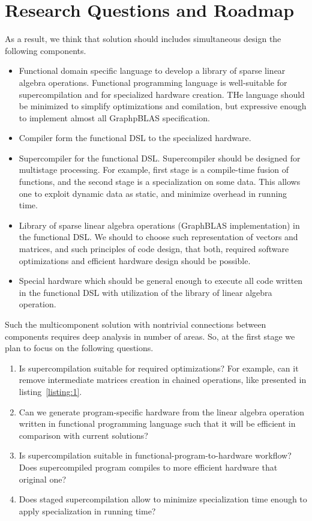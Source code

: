 \documentclass[10pt,conference]{IEEEtran}
\newcommand\todo[1]{{\color{red}#1}}
\begin{document}

\section{Research Questions and Roadmap}

As a result, we think that solution should includes simultaneous design the following components.
\begin{itemize}
  \item Functional domain specific language to develop a library of sparse linear algebra operations. 
  Functional programming language is well-suitable for supercompilation and for specialized hardware creation.
  THe language should be minimized to simplify optimizations and comilation, but expressive enough to implement almost all GraphpBLAS specification.
  \item Compiler form the functional DSL to the specialized hardware. 
  \item Supercompiler for the functional DSL. Supercompiler should be designed for multistage processing.
  For example, first stage is a compile-time fusion of functions, and the second stage is a specialization on some data. 
  This allows one to exploit dynamic data as static, and minimize overhead in running time. 
  \item Library of sparse linear algebra operations (GraphBLAS implementation) in the functional DSL.
  We should to choose such representation of vectors and matrices, and such principles of code design, that both, required software optimizations and efficient hardware design should be possible.  
  \item Special hardware which should be general enough to execute all code written in the functional DSL with utilization of the library of linear algebra operation.  
\end{itemize}

Such the multicomponent solution with nontrivial connections between components requires deep analysis in number of areas.
So, at the first stage we plan to focus on the following questions.
\begin{enumerate}
  \item Is supercompilation suitable for required optimizations? For example, can it remove intermediate matrices creation in chained operations, like presented in listing~\ref{listing:1}.
  \item Can we generate program-specific hardware from the linear algebra operation written in functional programming language such that it will be efficient in comparison with current solutions?
  \item Is supercompilation suitable in functional-program-to-hardware workflow? Does supercompiled program compiles to more efficient hardware that original one?
  \item Does staged supercompilation allow to minimize specialization time enough to apply specialization in running time? 
\end{enumerate}
\end{document}
